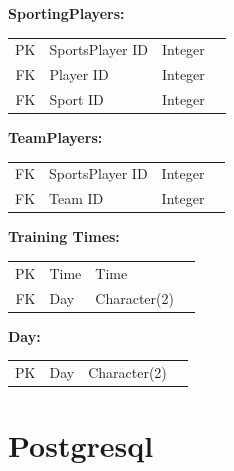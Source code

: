 \documentclass[10pt]{article}
\begin{document}
                \begin{center}
                    \textbf{SportingPlayers:}
                    \begin{tabular}{ | r | l | l | p{10cm} } 
                        \cline{1-3}
                        PK & SportsPlayer ID & Integer & \\ \cline{1-3}
                        FK & Player ID & Integer & \\ \cline{1-3}
                        FK & Sport ID & Integer & \\ \cline{1-3}
                    \end{tabular}
                \end{center}

                \begin{center}
                    \textbf{TeamPlayers:}
                    \begin{tabular}{ | r | l | l | p{10cm} } 
                        \cline{1-3}
                        FK & SportsPlayer ID & Integer & \\ \cline{1-3}
                        FK & Team ID & Integer & \\ \cline{1-3}
                    \end{tabular}
                \end{center}

                \begin{center}
                    \textbf{Training Times:}
                    \begin{tabular}{ | r | l | l | p{10cm} }
                        \cline{1-3}
                        PK & Time & Time & \\ \cline{1-3}
                        FK & Day & Character(2) & \\ \cline{1-3}
                    \end{tabular}
                \end{center}

                \begin{center}
                    \textbf{Day:}
                    \begin{tabular}{ | r | l | l | p{10cm} }
                        \cline{1-3}
                        PK & Day & Character(2) & \\ \cline{1-3}
                    \end{tabular}
                \end{center}

        \section{Postgresql}
\end{document}
